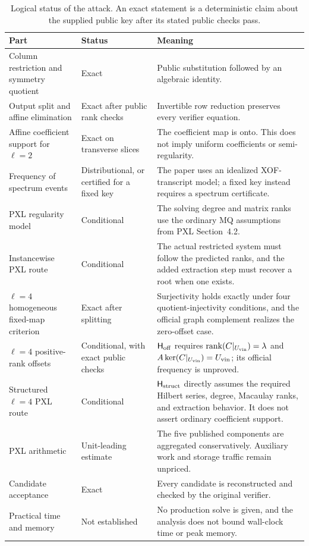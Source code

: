 \documentclass[11pt]{article}
\newcommand{\rank}{\operatorname{rank}}
\begin{document}
\begin{table}[H]
\centering
\caption{Logical status of the attack.  An exact statement is a deterministic
claim about the supplied public key after its stated public checks pass.}
\label{tab:logical-status}
\small
\renewcommand{\arraystretch}{1.11}
\begin{tabularx}{0.98\textwidth}{@{}>{\raggedright\arraybackslash}p{}>{\raggedright\arraybackslash}p{}X@{}}
\toprule
Part & Status & Meaning\\
\midrule
Column restriction and symmetry quotient & Exact & Public substitution followed by an algebraic identity.\\
Output split and affine elimination & Exact after public rank checks & Invertible row reduction preserves every verifier equation.\\
Affine coefficient support for $\ell=2$ & Exact on transverse slices & The coefficient map is onto.  This does not imply uniform coefficients or semi-regularity.\\
Frequency of spectrum events & Distributional, or certified for a fixed key & The paper uses an idealized XOF-transcript model; a fixed key instead requires a spectrum certificate.\\
PXL regularity model & Conditional & The solving degree and matrix ranks use the ordinary MQ assumptions from PXL Section~4.2.\\
Instancewise PXL route & Conditional & The actual restricted system must follow the predicted ranks, and the added extraction step must recover a root when one exists.\\
$\ell=4$ homogeneous fixed-map criterion & Exact after splitting & Surjectivity holds exactly under four quotient-injectivity conditions, and the official graph complement realizes the zero-offset case.\\
$\ell=4$ positive-rank offsets & Conditional, with exact public checks & $\mathsf H_{\rm off}$ requires $\rank(C|_{U_{\rm vin}})=\lambda$ and $A\ker(C|_{U_{\rm vin}})=U_{\rm vin}$; its official frequency is unproved.\\
Structured $\ell=4$ PXL route & Conditional & $\mathsf H_{\rm struct}$ directly assumes the required Hilbert series, degree, Macaulay ranks, and extraction behavior.  It does not assert ordinary coefficient support.\\
PXL arithmetic & Unit-leading estimate & The five published components are aggregated conservatively.  Auxiliary work and storage traffic remain unpriced.\\
Candidate acceptance & Exact & Every candidate is reconstructed and checked by the original verifier.\\
Practical time and memory & Not established & No production solve is given, and the analysis does not bound wall-clock time or peak memory.\\
\bottomrule
\end{tabularx}
\end{table}
\end{document}
